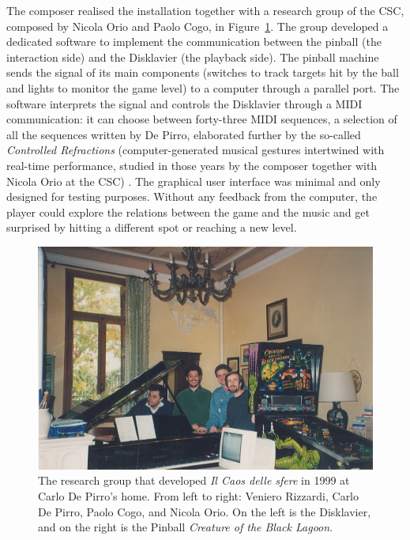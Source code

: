 The composer realised the installation together with a research group of the CSC, composed by Nicola Orio and Paolo Cogo, in Figure~\ref{fig:ab-ilcaosdellesfere-group01}. The group developed a dedicated software to implement the communication between the pinball (the interaction side) and the Disklavier (the playback side). The pinball machine sends the signal of its main components (switches to track targets hit by the ball and lights to monitor the game level) to a computer through a parallel port. The software interprets the signal and controls the Disklavier through a MIDI communication: it can choose between forty-three MIDI sequences, a selection of all the sequences written by De Pirro, elaborated further by the so-called \textit{Controlled Refractions} (computer-generated musical gestures intertwined with real-time performance, studied in those years by the composer together with Nicola Orio at the CSC) \cite{orio1998controlled}. The graphical user interface was minimal and only designed for testing purposes. Without any feedback from the computer, the player could explore the relations between the game and the music and get surprised by hitting a different spot or reaching a new level.

\begin{figure}[!h]
    \centering
    \includegraphics[width=\linewidth]{chapters/appendix/b/image/figb-ilcaosdellesfere-group01.jpg}
    \caption{The research group that developed \textit{Il Caos delle sfere} in 1999 at Carlo De Pirro’s home. From left to right: Veniero Rizzardi, Carlo De Pirro, Paolo Cogo, and Nicola Orio. On the left is the Disklavier, and on the right is the Pinball \textit{Creature of the Black Lagoon}.}
    \label{fig:ab-ilcaosdellesfere-group01}
\end{figure}

